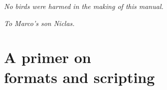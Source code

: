 \documentclass[a4paper,twoside,12pt]{memoir}
\begin{document}
\vspace*{25em}

\begin{flushright}
\em No birds were harmed in the making of this manual.
\end{flushright}






\cleardoublepage

\vspace*{25em}

\begin{flushright}
\em To Marco's son Niclas.
\end{flushright}

\cleardoublepage

\tableofcontents*

\cleardoublepage

\listoffigures*

\cleardoublepage

\listoftables*

\mainmatter

\part[A primer on formats and scripting]{A primer on\\ formats and scripting}
\label{part:primer}



\end{document}
